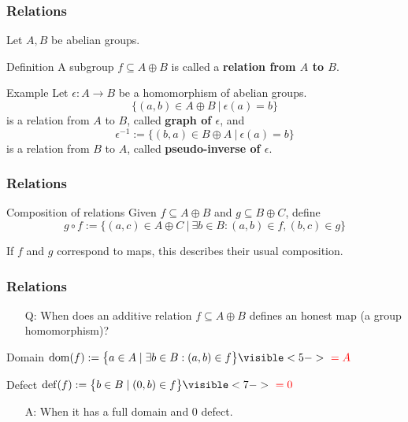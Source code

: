 \begin{frame}[fragile]
 \frametitle{Relations}
 Let $A,B$ be abelian groups.
 \pause
 \begin{block}{Definition}
  A subgroup $f \subseteq A \oplus B$ is called a \textbf{relation from $A$ to $B$}.
 \end{block}
 \pause
 \begin{block}{Example}
  Let $\epsilon: A \rightarrow B$ be a homomorphism of abelian groups. 
  \pause
  \[
   \{ (a,b) \in A \oplus B ~|~ \epsilon(a) = b \}
  \]
  is a relation from $A$ to $B$\pause, called \textbf{graph of $\epsilon$}\pause, and
  \[
   \epsilon^{-1} := \{ (b,a) \in B \oplus A ~|~ \epsilon(a) = b \}
  \]
  is a relation from $B$ to $A$\pause, called \textbf{pseudo-inverse of $\epsilon$}.
 \end{block}
\end{frame}

\begin{frame}[fragile]
 \frametitle{Relations}
 \begin{block}{Composition of relations}
  \pause Given $f \subseteq A \oplus B$ and $g \subseteq B \oplus C$, define \pause
  \[
   g \circ f := \{ (a,c) \in A \oplus C ~|~ \exists b \in B: (a,b) \in f, (b,c) \in g \}
  \]
 \end{block}
 \pause
\begin{center}
 If $f$ and $g$ correspond to maps, this describes their usual composition.
\end{center}
\end{frame}

\begin{frame}[fragile]
 \frametitle{Relations}
 \begin{itemize}
  \item[Q:] When does an additive relation $f \subseteq A \oplus B$ defines an honest map (a group homomorphism)?
 \end{itemize}
 \pause
 \begin{block}{Domain}
  $\domain(f) := \big\{ a \in A \mid \exists b \in B: (a,b) \in f \big\} \visible<5->{{\color{red}\ = A}}$
 \end{block}
 \pause
 \begin{block}{Defect}
  $\defect(f) := \big\{ b \in B \mid (0,b) \in f \big\} \visible<7->{{\color{red}\ = 0 }}$
 \end{block}
 \pause
 \begin{itemize}
  \item[A:] When it has a full domain \pause\pause and $0$ defect.
 \end{itemize}

\end{frame}

